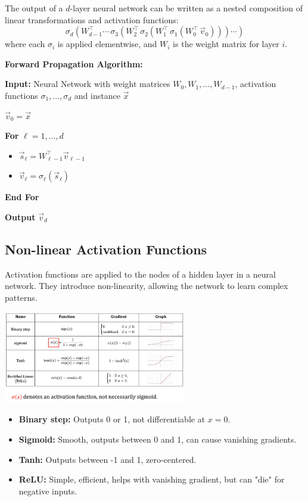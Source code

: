 The output of a $d$-layer neural network can be written as a nested composition of linear transformations and activation functions:
\[
\sigma_d\left(W_{d-1}^\top \cdots\, \sigma_3\left(W_2^\top\, \sigma_2\left(W_1^\top\, \sigma_1\left(W_0^\top\, \vec{v}_0\right)\right)\right)\cdots\right)
\]
where each $\sigma_i$ is applied elementwise, and $W_i$ is the weight matrix for layer $i$.

\begin{algobox}
\textbf{Forward Propagation Algorithm:}

\textbf{Input:} Neural Network with weight matrices $W_0, W_1, \ldots, W_{d-1}$, activation functions $\sigma_1, \ldots, \sigma_d$ and instance $\vec{x}$

$\vec{v}_0 = \vec{x}$

\textbf{For} $\ell = 1, \ldots, d$
\begin{itemize}
    \item $\vec{s}_\ell = W_{\ell-1}^\top \vec{v}_{\ell-1}$
    \item $\vec{v}_\ell = \sigma_\ell(\vec{s}_\ell)$
\end{itemize}
\textbf{End For}

\textbf{Output} $\vec{v}_d$
\end{algobox}

\subsection{Non-linear Activation Functions}

Activation functions are applied to the nodes of a hidden layer in a neural network. They introduce non-linearity, allowing the network to learn complex patterns.

\begin{center}
\includegraphics[width=0.6\textwidth]{Images/activations.png}
\end{center}

\begin{itemize}
    \item \textbf{Binary step:} Outputs 0 or 1, not differentiable at $x=0$.
    \item \textbf{Sigmoid:} Smooth, outputs between 0 and 1, can cause vanishing gradients.
    \item \textbf{Tanh:} Outputs between -1 and 1, zero-centered.
    \item \textbf{ReLU:} Simple, efficient, helps with vanishing gradient, but can "die" for negative inputs.
\end{itemize}

